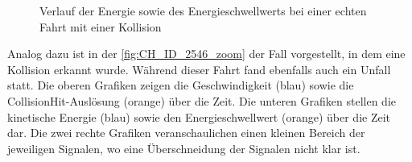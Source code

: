 \begin{figure}
	\centering 
	\caption{Verlauf der Energie sowie des Energieschwellwerts bei einer echten Fahrt mit einer Kollision}
	\label{fig:CH_ID_2546_zoom}
\end{figure}
Analog dazu ist in der \autoref{fig:CH_ID_2546_zoom} der Fall vorgestellt, in dem eine Kollision erkannt wurde. Während dieser Fahrt fand ebenfalls auch ein Unfall statt. 
Die oberen Grafiken zeigen die Geschwindigkeit (blau) sowie die CollisionHit-Auslösung (orange) über die Zeit.
Die unteren Grafiken stellen die kinetische Energie (blau) sowie den Energieschwellwert (orange) über die Zeit dar.
Die zwei rechte Grafiken veranschaulichen einen kleinen Bereich der jeweiligen Signalen, wo eine Überschneidung der Signalen nicht klar ist.




